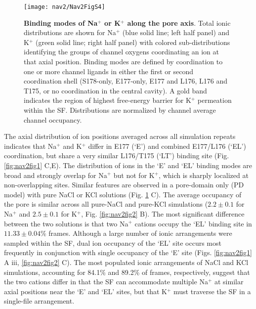 \begin{refsection}
\begin{figure}[!ptb]
\centering
\texttt{[image: nav2/Nav2FigS4]}
\caption[Binding modes of Na$^+$ or K$^+$ along the pore axis]{\textbf{Binding modes of Na$^+$ or K$^+$ along the pore axis}. Total ionic distributions are shown for Na$^+$ (blue solid line; left half panel) and K$^+$ (green solid line; right half panel) with colored sub-distributions identifying the groups of channel oxygens coordinating an ion at that axial position. Binding modes are defined by coordination to one or more channel ligands in either the first or second coordination shell (S178-only, E177-only, E177 and L176, L176 and T175, or no coordination in the central cavity). A gold band indicates the region of highest free-energy barrier for K$^+$ permeation within the SF. Distributions are normalized by channel average channel occupancy.}
\label{fig:nav2figS4}
\end{figure}

The axial distribution of ion positions averaged across all simulation repeats indicates that Na$^+$ and K$^+$ differ in E177 (`E') and combined E177/L176 (`EL') coordination, but share a very similar L176/T175 (`LT') binding site (Fig. \ref{fig:nav2fig1} C,E). The distribution of ions in the `E' and `EL' binding modes are broad and strongly overlap for Na$^+$ but not for K$^+$, which is sharply localized at non-overlapping sites. Similar features are observed in a pore-domain only (PD model) with pure NaCl or KCl solutions (Fig. \ref{fig:nav2figS4} C). The average occupancy of the pore is similar across all pure-NaCl and pure-KCl simulations ($2.2 \pm 0.1$ for Na$^+$ and $2.5 \pm 0.1$ for K$^+$, Fig. \ref{fig:nav2fig2} B). The most significant difference between the two solutions is that two Na$^+$ cations occupy the `EL' binding site in $11.33 \pm 0.04$\% frames. Although a large number of ionic arrangements were sampled within the SF, dual ion occupancy of the `EL' site occurs most frequently in conjunction with single occupancy of the `E' site (Figs. \ref{fig:nav2fig1} A iii, \ref{fig:nav2fig2} C).  The most populated ionic arrangements of NaCl and KCl simulations, accounting for 84.1\% and 89.2\% of frames, respectively, suggest that the two cations differ in that the SF can accommodate multiple Na$^+$ at similar axial positions near the `E' and `EL' sites, but that K$^+$ must traverse the SF in a single-file arrangement. 


\end{refsection}
